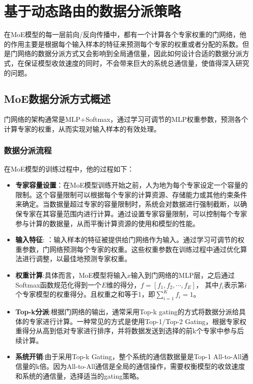 \chapter{基于动态路由的数据分派策略}

在MoE模型的每一层前向/反向传播中，都有一个计算各个专家权重的门网络，他的作用主要是根据每个输入样本的特征来预测每个专家的权重或者分配的系数。但是门网络的数据分派方式又会影响到全局通信量，因此如何设计合适的数据分派方式，在保证模型收敛速度的同时，不会带来巨大的系统总通信量，使值得深入研究的问题。

\section{MoE数据分派方式概述}

门网络的架构通常是MLP+Softmax，通过学习可调节的MLP权重参数，预测各个计算专家的权重，从而实现对输入样本的有效处理。

\subsection{数据分派流程}

在MoE模型的训练过程中，他的过程如下：

\begin{itemize}
    \item \textbf{专家容量设置}：在MoE模型训练开始之前，人为地为每个专家设定一个容量的限制。这个容量限制可以根据每个专家的计算资源、存储能力或其他约束条件来确定。当数据量超过专家的容量限制时，系统会对数据进行强制截断，以确保专家在其容量范围内进行计算。通过设置专家容量限制，可以控制每个专家参与计算的数据量，从而平衡计算资源的使用和模型的性能。
    \item \textbf{输入特征}: ：输入样本的特征被提供给门网络作为输入。通过学习可调节的权重参数，门网络预测每个专家的权重。这些权重参数在训练过程中通过优化算法进行调整，以最佳地预测专家权重。
    \item \textbf{权重计算}:具体而言，MoE模型将输入$x$输入到门网络的MLP层，之后通过Softmax函数规范化得到一个$E$维的得分，$f=[f_1,f_2,\cdots,f_E]$， 其中$f_i$表示第$i$个专家模型的权重得分。且权重之和等于1，即$\sum_{i=1}^K f_i = 1$。
    \item \textbf{Top-k分派}:根据门网络的输出，通常采用Top-k gating的方式将数据分派给具体的专家进行计算。一种常见的方式是使用Top-1/Top-2 Gating，根据专家权重得分从高到低对专家进行排序，并将数据发送到选择的前k个专家中参与后续计算。
    \item \textbf{系统开销}:由于采用Top-k Gating，整个系统的通信数据量是Top-1 All-to-All通信量的k倍。因为All-to-All通信是全局的通信操作，需要权衡模型的收敛速度和系统的通信量，选择适当的gating策略。
\end{itemize}

